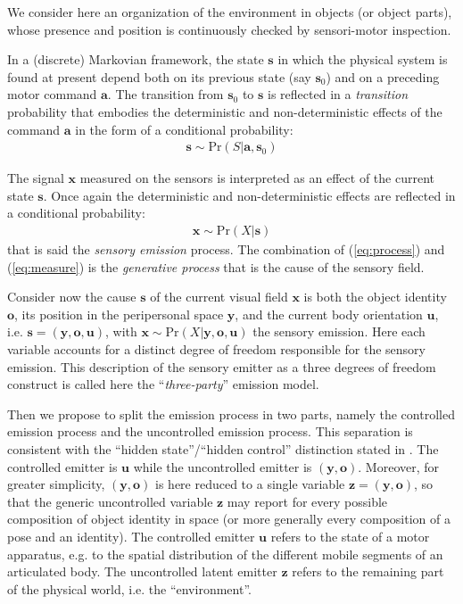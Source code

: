 \documentclass[12pt,twoside,openright]{article}
\begin{document}
We consider here an organization of the environment in objects (or object parts), whose presence and position is continuously checked by sensori-motor inspection.
{\color{Purple} 
In a (discrete) Markovian framework, the state $\boldsymbol{s}$ in which the physical system is found at present depend both on its previous state (say $\boldsymbol{s}_0$) and on a preceding motor command $\boldsymbol{a}$.
The transition from $\boldsymbol{s}_0$ to $\boldsymbol{s}$ is reflected in a \emph{transition} probability that embodies the deterministic and non-deterministic effects of the command $\boldsymbol{a}$ in the form of a conditional probability:  
\begin{align}
\boldsymbol{s} \sim \text{Pr}(S|\boldsymbol{a},\boldsymbol{s}_0) \label{eq:process}
\end{align}

The signal $\boldsymbol{x}$ measured on the sensors is interpreted as an effect of the current state $\boldsymbol{s}$. Once again the deterministic and non-deterministic effects are reflected in a conditional probability:
\begin{align}
\boldsymbol{x} \sim \text{Pr}(X|\boldsymbol{s})\label{eq:measure}
\end{align}
that is said the \emph{sensory emission} process.
The combination of  (\ref{eq:process}) and (\ref{eq:measure}) is the \emph{generative process} that is the cause of the sensory field.}
{\color{Purple} Consider now} the cause $\boldsymbol{s}$ of the current visual field $\boldsymbol{x}$ is both the object identity $\boldsymbol{o}$, its position in the peripersonal space $\boldsymbol{y}$, and the current body orientation  $\boldsymbol{u}$, i.e. $\boldsymbol{s} = (\boldsymbol{y},\boldsymbol{o},\boldsymbol{u})$, with $\boldsymbol{x} \sim \text{Pr}(X|\boldsymbol{y},\boldsymbol{o},\boldsymbol{u})$ {\color{Purple}the  sensory emission. Here} each variable accounts for a distinct degree of freedom {\color{Purple} responsible for the sensory emission}. This description of the sensory emitter as a three degrees of freedom construct is called here the ``\emph{three-party}'' emission model.

Then we propose to split the {\color{Purple} emission} process in two parts, namely the controlled {\color{Purple} emission} process and the uncontrolled {\color{Purple} emission} process. 
This separation 
is consistent with the ``hidden state''/``hidden control'' distinction stated in \citep{friston2012perceptions}.
The controlled emitter is $\boldsymbol{u}$ while the uncontrolled emitter is  $(\boldsymbol{y}, \boldsymbol{o})$. 
Moreover, for greater simplicity, $(\boldsymbol{y},\boldsymbol{o})$ is here reduced to a single variable $\boldsymbol{z} = (\boldsymbol{y}, \boldsymbol{o})$, 
so that the generic uncontrolled variable $\boldsymbol{z}$ may report for every possible composition of object identity in space (or more generally every composition of a pose and an identity).
The controlled emitter $\boldsymbol{u}$ refers to the state of a motor apparatus, e.g. to the spatial distribution of the different mobile segments of an articulated body. The uncontrolled latent emitter $\boldsymbol{z}$  refers to the remaining part of the physical world, i.e. the ``environment''. 
\end{document}
